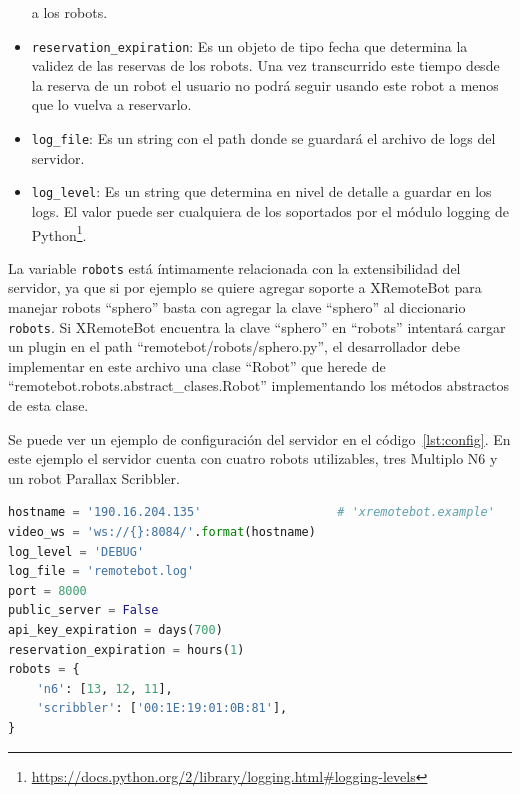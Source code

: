 \begin{itemize}
        a los robots.
    \item \texttt{reservation\_expiration}: Es un objeto de tipo
        fecha que determina la validez de las reservas de los robots.
        Una vez transcurrido este tiempo desde la reserva de un robot
        el usuario no podrá seguir usando este robot a menos que lo
        vuelva a reservarlo.
    \item \texttt{log\_file}: Es un string con el path donde se
        guardará el archivo de logs del servidor.
    \item \texttt{log\_level}: Es un string que determina en nivel
        de detalle a guardar en los logs. El valor puede ser
        cualquiera de los soportados por el módulo logging de
        Python\footnote{\url{https://docs.python.org/2/library/logging.html\#logging-levels}}.
\end{itemize}

La variable \texttt{robots} está íntimamente
relacionada con la extensibilidad del servidor, ya que si por ejemplo
se quiere agregar soporte a XRemoteBot para manejar robots ``sphero''
basta con agregar la clave ``sphero'' al diccionario
\texttt{robots}. Si XRemoteBot encuentra la clave ``sphero'' en ``robots''
intentará cargar un plugin en el path
``remotebot/robots/sphero.py'',
el desarrollador debe implementar en este archivo una clase ``Robot''
que herede de ``remotebot.robots.abstract\_clases.Robot'' implementando
los métodos abstractos de esta clase.

Se puede ver un ejemplo de configuración del servidor en el
código~\ref{lst:config}. En este ejemplo el servidor cuenta
con cuatro robots utilizables, tres Multiplo N6 y un robot
Parallax Scribbler.

\begin{lstlisting}[language=python,
    caption={Configuración de ejemplo de XRemoteBot en
    \texttt{configuration.py}},
    label=lst:config]
hostname = '190.16.204.135'                   # 'xremotebot.example'
video_ws = 'ws://{}:8084/'.format(hostname)
log_level = 'DEBUG'
log_file = 'remotebot.log'
port = 8000
public_server = False
api_key_expiration = days(700)
reservation_expiration = hours(1)
robots = {
    'n6': [13, 12, 11],
    'scribbler': ['00:1E:19:01:0B:81'],
}
\end{lstlisting}

% 
% 

